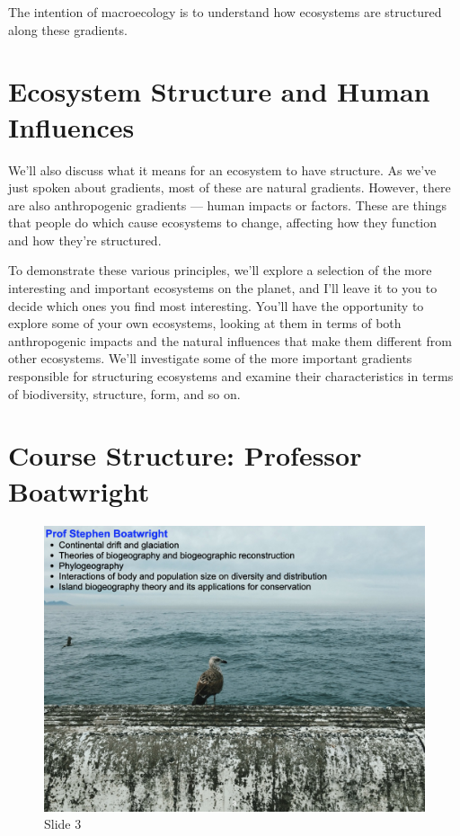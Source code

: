 \documentclass[
  12pt,
]{book}
\begin{document}
The intention of macroecology is to understand how ecosystems are
structured along these gradients.

\section{Ecosystem Structure and Human
Influences}\label{ecosystem-structure-and-human-influences}

We'll also discuss what it means for an ecosystem to have structure. As
we've just spoken about gradients, most of these are natural gradients.
However, there are also anthropogenic gradients --- human impacts or
factors. These are things that people do which cause ecosystems to
change, affecting how they function and how they're structured.

To demonstrate these various principles, we'll explore a selection of
the more interesting and important ecosystems on the planet, and I'll
leave it to you to decide which ones you find most interesting. You'll
have the opportunity to explore some of your own ecosystems, looking at
them in terms of both anthropogenic impacts and the natural influences
that make them different from other ecosystems. We'll investigate some
of the more important gradients responsible for structuring ecosystems
and examine their characteristics in terms of biodiversity, structure,
form, and so on.

\section{Course Structure: Professor
Boatwright}\label{course-structure-professor-boatwright}

\begin{figure}[ht]
\centering
\includegraphics[width=0.8\linewidth]{../images/BDC334/BDC334-003.jpeg}
\caption*{Slide 3}
\end{figure}
\end{document}

